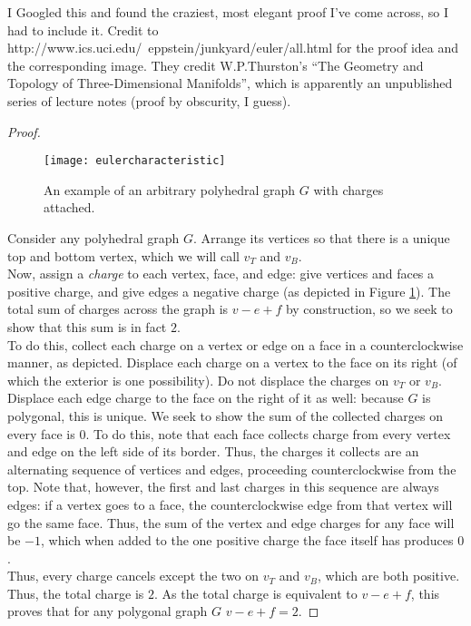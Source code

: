 \begin{note}
  I Googled this and found the craziest, most elegant proof I've come across, so I had to include it. Credit to http://www.ics.uci.edu/~eppstein/junkyard/euler/all.html for the proof idea and the corresponding image. They credit W.P.Thurston's ``The Geometry and Topology of Three-Dimensional Manifolds'', which is apparently an unpublished series of lecture notes (proof by obscurity, I guess).
\end{note}
\begin{proof}
  \begin{figure}[p]
    \caption{An example of an arbitrary polyhedral graph $G$ with charges attached.}
    \centering
    \texttt{[image: eulercharacteristic]}
    \label{fig:charge_euler}
  \end{figure}
  Consider any polyhedral graph $G$. Arrange its vertices so that there is a unique top and bottom vertex, which we will call $v_T$ and $v_B$. \\
  Now, assign a \textit{charge} to each vertex, face, and edge: give vertices and faces a positive charge, and give edges a negative charge (as depicted in Figure \ref{fig:charge_euler}). The total sum of charges across the graph is $v - e + f$ by construction, so we seek to show that this sum is in fact $2$. \\
  To do this, collect each charge on a vertex or edge on a face in a counterclockwise manner, as depicted. Displace each charge on a vertex to the face on its right (of which the exterior is one possibility). Do not displace the charges on $v_T$ or $v_B$. Displace each edge charge to the face on the right of it as well: because $G$ is polygonal, this is unique. We seek to show the sum of the collected charges on every face is $0$. To do this, note that each face collects charge from every vertex and edge on the left side of its border. Thus, the charges it collects are an alternating sequence of vertices and edges, proceeding counterclockwise from the top. Note that, however, the first and last charges in this sequence are always edges: if a vertex goes to a face, the counterclockwise edge from that vertex will go the same face. Thus, the sum of the vertex and edge charges for any face will be $-1$, which when added to the one positive charge the face itself has produces $0$. \\
  Thus, every charge cancels except the two on $v_T$ and $v_B$, which are both positive. Thus, the total charge is $2$. As the total charge is equivalent to $v - e + f$, this proves that for any polygonal graph $G$ $v - e + f = 2$.
\end{proof}

